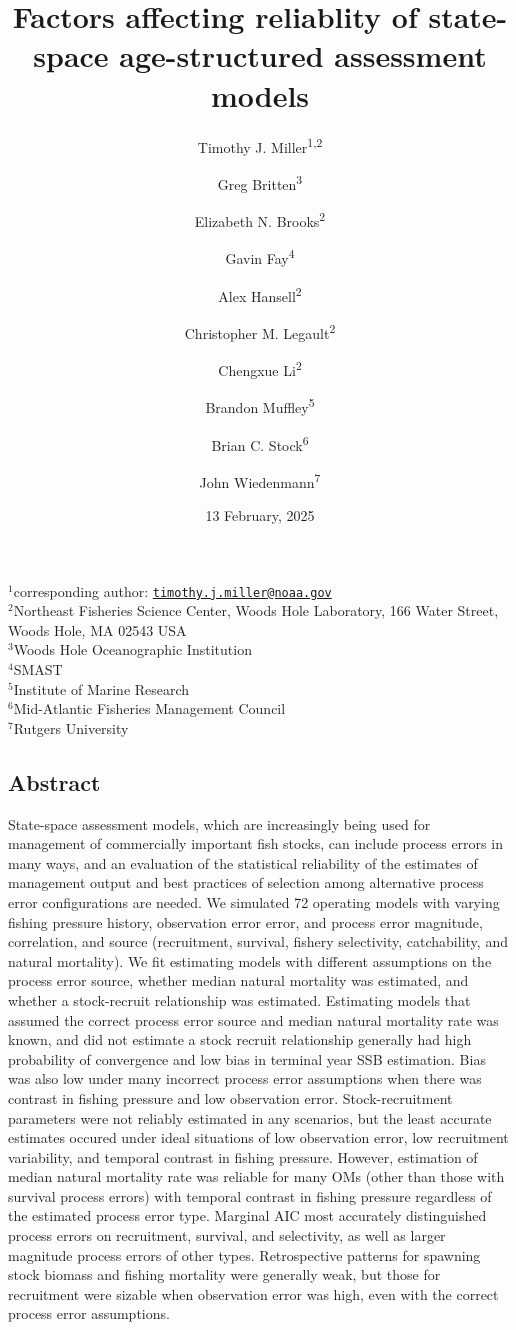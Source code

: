 \documentclass[
  12pt,
]{article}
\title{Factors affecting reliablity of state-space age-structured
assessment models}
\author{Timothy J. Miller\textsuperscript{1,2} \and Greg
Britten\textsuperscript{3} \and Elizabeth N.
Brooks\textsuperscript{2} \and Gavin Fay\textsuperscript{4} \and Alex
Hansell\textsuperscript{2} \and Christopher M.
Legault\textsuperscript{2} \and Chengxue
Li\textsuperscript{2} \and Brandon Muffley\textsuperscript{5} \and Brian
C. Stock\textsuperscript{6} \and John Wiedenmann\textsuperscript{7}}
\date{13 February, 2025}
\begin{document}
\maketitle

\(^1\)corresponding author:
\href{mailto:timothy.j.miller@noaa.gov}{\nolinkurl{timothy.j.miller@noaa.gov}}\\
\(^2\)Northeast Fisheries Science Center, Woods Hole Laboratory, 166
Water Street, Woods Hole, MA 02543 USA\\
\(^3\)Woods Hole Oceanographic Institution\\
\(^4\)SMAST\\
\(^5\)Institute of Marine Research\\
\(^6\)Mid-Atlantic Fisheries Management Council\\
\(^7\)Rutgers University\\

\pagebreak

\hypertarget{abstract}{%
\subsection*{Abstract}\label{abstract}}

State-space assessment models, which are increasingly being used for
management of commercially important fish stocks, can include process
errors in many ways, and an evaluation of the statistical reliability of
the estimates of management output and best practices of selection among
alternative process error configurations are needed. We simulated 72
operating models with varying fishing pressure history, observation
error error, and process error magnitude, correlation, and source
(recruitment, survival, fishery selectivity, catchability, and natural
mortality). We fit estimating models with different assumptions on the
process error source, whether median natural mortality was estimated,
and whether a stock-recruit relationship was estimated. Estimating
models that assumed the correct process error source and median natural
mortality rate was known, and did not estimate a stock recruit
relationship generally had high probability of convergence and low bias
in terminal year SSB estimation. Bias was also low under many incorrect
process error assumptions when there was contrast in fishing pressure
and low observation error. Stock-recruitment parameters were not
reliably estimated in any scenarios, but the least accurate estimates
occured under ideal situations of low observation error, low recruitment
variability, and temporal contrast in fishing pressure. However,
estimation of median natural mortality rate was reliable for many OMs
(other than those with survival process errors) with temporal contrast
in fishing pressure regardless of the estimated process error type.
Marginal AIC most accurately distinguished process errors on
recruitment, survival, and selectivity, as well as larger magnitude
process errors of other types. Retrospective patterns for spawning stock
biomass and fishing mortality were generally weak, but those for
recruitment were sizable when observation error was high, even with the
correct process error assumptions.
\end{document}
